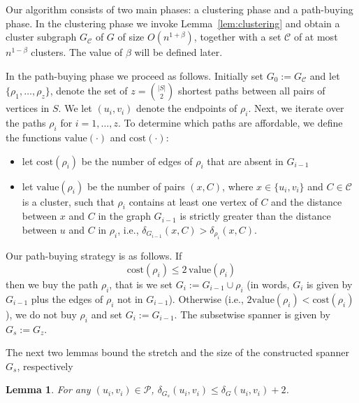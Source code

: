 \documentclass[a4paper,11pt]{article}
\newtheorem{lemma}{Lemma}[section]
\theoremstyle{definition}
\newcommand{\dist}{\delta}
\newcommand{\cost}{\mathrm{cost}}
\newcommand{\val}{\mathrm{value}}
\newcommand{\cP}{\mathcal{P}}
\newcommand{\cC}{\mathcal{C}}
\begin{document}
Our algorithm 
consists of two main phases: a clustering phase and a path-buying phase. In the clustering phase we invoke Lemma~\ref{lem:clustering} 
and obtain a cluster subgraph $G_\cC$ of $G$ of size $O(n^{1+\beta})$,
together with a set $\cC$ of at most $n^{1-\beta}$ clusters. The value of $\beta$ will be defined later.

In the path-buying phase we proceed as follows. 
Initially set $G_0:=G_\cC$ and let $\{\rho_1, \ldots, \rho_z \}$,  denote
the set of $z=\binom{|S|}{2}$ shortest paths between all pairs of vertices in $S$. We let $(u_i,v_i)$ denote the endpoints of $\rho_i$.
Next, we iterate over the paths $\rho_i$ for $i=1,\ldots,z$. 
To determine which paths are affordable, we define the functions $\val(\cdot)$
and $\cost(\cdot)$:
\begin{itemize}
\item let $\cost(\rho_i)$ be the number of edges of $\rho_i$ that are absent in $G_{i-1}$
\item let $\val(\rho_i)$ be the number of pairs $(x,C)$, where $x \in \{u_i, v_i\}$ and 
$C \in \cC$ is a cluster, such that $\rho_i$ contains at least one vertex of $C$
and the distance between $x$ and $C$ in the graph $G_{i-1}$
is strictly greater than the distance between $u$ and $C$ in $\rho_i$, 
i.e., $\delta_{G_{i-1}}(x,C) > \delta_{\rho_i}(x,C)$.
\end{itemize}





Our path-buying strategy is as follows. If 
$$\cost(\rho_i)\leq 2\,\val(\rho_i)$$ 
then we buy the path $\rho_i$, that is we set $G_i:=G_{i-1}\cup \rho_i$ 
(in words, $G_i$ is given by $G_{i-1}$ plus the edges of $\rho_i$ not in $G_{i-1}$).
Otherwise (i.e., $2\val(\rho_i) < \cost(\rho_i)$), we do not buy $\rho_i$
and set $G_i:=G_{i-1}$.
The subsetwise spanner is given by $G_s:=G_z$.












The next two lemmas bound the stretch and the size of the constructed spanner $G_s$, respectively

\begin{lemma}
\label{lem:s-1}
For any $(u_i,v_i) \in \cP$,  $\dist_{G_s}(u_i,v_i) \le \dist_G(u_i,v_i)+2$.
\end{lemma}
\end{document}
